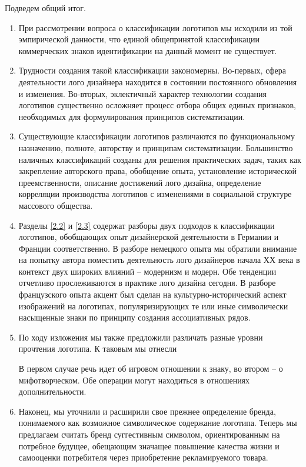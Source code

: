 Подведем общий итог.
\begin{enumerate}
\item При рассмотрении вопроса о классификации логотипов мы исходили из той
  эмпирической данности, что единой общепринятой классификации коммерческих
  знаков идентификации на данный момент не существует.
\item Трудности создания такой классификации закономерны. Во-первых, сфера
  деятельности лого дизайнера находится в состоянии постоянного обновления и
  изменения. Во-вторых, эклектичный характер технологии создания логотипов
  существенно осложняет процесс отбора общих единых признаков, необходимых для
  формулирования принципов систематизации.
\item Существующие классификации логотипов различаются по функциональному
  назначению, полноте, авторству и принципам систематизации. Большинство
  наличных классификаций созданы для решения практических задач, таких как
  закрепление авторского права, обобщение опыта, установление исторической
  преемственности, описание достижений лого дизайна, определение корреляции
  производства логотипов с изменениями в социальной структуре массового
  общества.
\item Разделы \ref{2.2} и \ref{2.3} содержат разборы двух подходов к
  классификации логотипов, обобщающих опыт дизайнерской деятельности в
  Германии и Франции соответственно. В разборе немецкого опыта мы обратили
  внимание на попытку автора поместить деятельность лого дизайнеров начала
  ХХ века в контекст двух широких влияний -- модернизм и модерн. Обе тенденции
  отчетливо прослеживаются в практике лого дизайна сегодня. В разборе
  французского опыта акцент был сделан на культурно-исторический аспект
  изображений на логотипах, популяризирующих те или иные символически насыщенные
  знаки по принципу создания ассоциативных рядов.
\item По ходу изложения мы также предложили различать разные уровни прочтения
  логотипа. К таковым мы отнесли
  В первом случае речь идет об игровом отношении к знаку, во втором -- о
  мифотворческом. Обе операции могут находиться в отношениях дополнительности.
\item Наконец, мы уточнили и расширили свое прежнее определение бренда,
  понимаемого как возможное символическое содержание логотипа. Теперь мы
  предлагаем считать бренд суггестивным символом, ориентированным на потребное
  будущее, обещающим значащее повышение качества жизни и самооценки потребителя
  через приобретение рекламируемого товара.
\end{enumerate}

